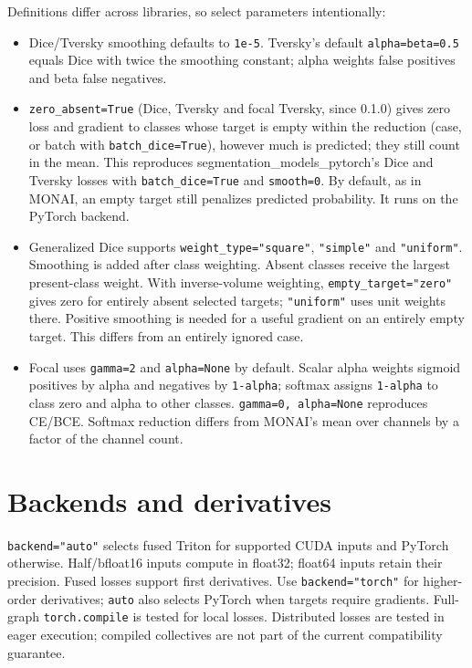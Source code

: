 Definitions differ across libraries, so select parameters intentionally:

\begin{itemize}
\tightlist
\item
  Dice/Tversky smoothing defaults to \texttt{1e-5}. Tversky's default \texttt{alpha=beta=0.5} equals Dice
  with twice the smoothing constant; alpha weights false positives and beta false negatives.
\item
  \texttt{zero\_absent=True} (Dice, Tversky and focal Tversky, since 0.1.0) gives zero loss and
  gradient to classes whose target is empty within the reduction (case, or batch with
  \texttt{batch\_dice=True}), however much is predicted; they still count in the mean. This reproduces
  segmentation\_models\_pytorch's Dice and Tversky losses with \texttt{batch\_dice=True} and \texttt{smooth=0}.
  By default, as in MONAI, an empty target still penalizes predicted probability. It runs on the
  PyTorch backend.
\item
  Generalized Dice supports \texttt{weight\_type="square"}, \texttt{"simple"} and \texttt{"uniform"}. Smoothing
  is added after class weighting. Absent classes receive the largest present-class weight.
  With inverse-volume weighting, \texttt{empty\_target="zero"} gives zero for entirely absent selected
  targets; \texttt{"uniform"} uses unit weights there. Positive smoothing is needed for a useful
  gradient on an entirely empty target. This differs from an entirely ignored case.
\item
  Focal uses \texttt{gamma=2} and \texttt{alpha=None} by default. Scalar alpha weights sigmoid positives by
  alpha and negatives by \texttt{1-alpha}; softmax assigns \texttt{1-alpha} to class zero and alpha to other
  classes. \texttt{gamma=0,\ alpha=None} reproduces CE/BCE. Softmax reduction differs from MONAI's mean
  over channels by a factor of the channel count.
\end{itemize}

\section{Backends and derivatives}\label{losses:backends-and-derivatives}

\texttt{backend="auto"} selects fused Triton for supported CUDA inputs and PyTorch otherwise.
Half/bfloat16 inputs compute in float32; float64 inputs retain their precision. Fused losses
support first derivatives. Use \texttt{backend="torch"} for higher-order derivatives; \texttt{auto} also
selects PyTorch when targets require gradients. Full-graph \texttt{torch.compile} is tested for
local losses. Distributed losses are tested in eager execution; compiled collectives are
not part of the current compatibility guarantee.

